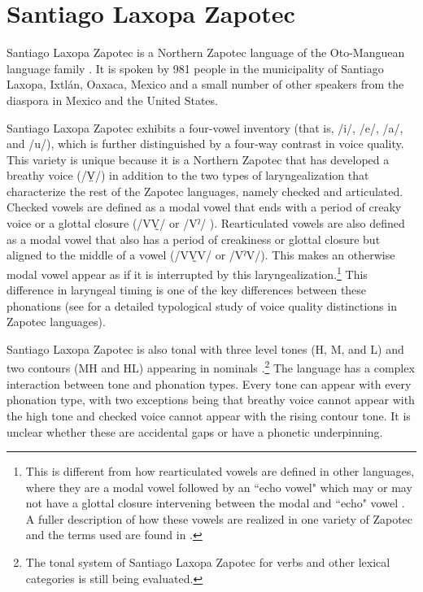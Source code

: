 \section{Santiago Laxopa Zapotec} \label{sec:SLZ}
Santiago Laxopa Zapotec is a Northern Zapotec language of the Oto-Manguean language family \citep{adlerAcousticsPhonationTypes2016,adlerDerivationVerbInitiality2018,foleyForbiddenCliticClusters2018,foleyExtendingPersonCaseConstraint2022,sichelPronounsAttractionSierra2020,
sichelFeaturalLifeNominals2020,brinkerhoffDownstepSantiagoLaxopa2021,brinkerhoffTonalPatternsTheir2022}. It is spoken by 981 people in the municipality of Santiago Laxopa, Ixtlán, Oaxaca, Mexico and a small number of other speakers from the diaspora in Mexico and the United States. 

Santiago Laxopa Zapotec exhibits a four-vowel inventory (that is, /i/, /e/, /a/, and /u/), which is further distinguished by a four-way contrast in voice quality. This variety is unique because it is a Northern Zapotec that has developed a breathy voice (/V̤/) in addition to the two types of laryngealization that characterize the rest of the Zapotec languages, namely checked and articulated. Checked vowels are defined as a modal vowel that ends with a period of creaky voice or a glottal closure (/VV̰/ or /Vˀ/ ). Rearticulated vowels are also defined as a modal vowel that also has a period of creakiness or glottal closure but aligned to the middle of a vowel (/VV̰V/ or /VˀV/). This makes an otherwise modal vowel appear as if it is interrupted by this laryngealization.\footnote{This is different from how rearticulated vowels are defined in other languages, where they are a modal vowel followed by an ``echo vowel" which may or may not have a glottal closure intervening between the modal and ``echo" vowel \citep[see][]{bairdPhoneticPhonologicalRealizations2011}. A fuller description of how these vowels are realized in one variety of Zapotec and the terms used are found in \citet{avelinoAcousticElectroglottographicAnalyses2010}.} This difference in laryngeal timing is one of the key differences between these phonations (see \cite{ariza-garciaPhonationTypesTones2018} for a detailed typological study of voice quality distinctions in Zapotec languages).

Santiago Laxopa Zapotec is also tonal with three level tones (H, M, and L) and two contours (MH and HL) appearing in nominals \citep{brinkerhoffTonalPatternsTheir2022}.\footnote{The tonal system of Santiago Laxopa Zapotec for verbs and other lexical categories is still being evaluated.} The language has a complex interaction between tone and phonation types. Every tone can appear with every phonation type, with two exceptions being that breathy voice cannot appear with the high tone and checked voice cannot appear with the rising contour tone. It is unclear whether these are accidental gaps or have a phonetic underpinning.

